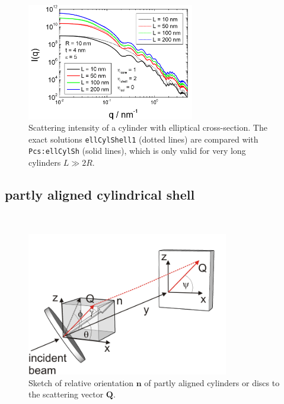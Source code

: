 \begin{figure}[htb]
\begin{center}
\includegraphics[width=0.65\textwidth,height=0.5\textwidth]{../images/form_factor/cylindrical_obj/Pcs_ellCylShell.png}
\end{center}
\caption{Scattering intensity of a cylinder with elliptical cross-section.
The exact solutions \texttt{ellCylShell1} (dotted lines) are compared
with \texttt{Pcs:ellCylSh} (solid lines), which is only valid for very long cylinders $L \gg 2R$. }
\label{fig:Pcs_ellCylShell}
\end{figure}


\clearpage

\subsection{partly aligned cylindrical shell \cite{Hayter1984}}
\label{sect:partlyalignedCylShell}
\hspace{1pt}\\
\begin{figure}[htb]
\begin{center}
\includegraphics[width=0.786\textwidth,height=0.558\textwidth]{../images/form_factor/cylindrical_obj/partly_aligned_discs.png}
\end{center}
\caption{Sketch of relative orientation $\mathbf{n}$ of partly
aligned cylinders or discs to the scattering vector $\mathbf{Q}$.}
\label{fig:partly_aligned_discs}
\end{figure}

